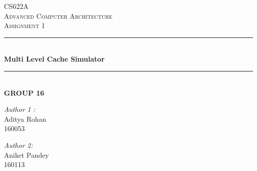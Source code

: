 \documentclass[12pt]{article}
\begin{document}
\begin{titlepage}
\newcommand{\HRule}{\rule{\linewidth}{0.1mm}} 
\center %
 
\textsc{\Large CS622A}\\[0.4cm] %
\textsc{\Large Advanced Computer Architecture}\\[0.4cm] %
\textsc{\large Assignment 1 }\\[0.4cm] %

\HRule \\[0.4cm]
{ \huge \bfseries Multi Level Cache Simulator}\\[0.1cm] %
\HRule \\[0.5cm]
{ \large \bfseries GROUP 16}\\[1cm]
 

\begin{minipage}{0.4\textwidth}
\begin{flushleft} \large

\emph{Author 1 :}\\
Aditya Rohan\\160053  %
\end{flushleft}
\begin{flushleft} \large

\emph{Author 2:}\\
Aniket Pandey\\160113  %
\end{flushleft}



\end{minipage}
\end{titlepage}
\end{document}
